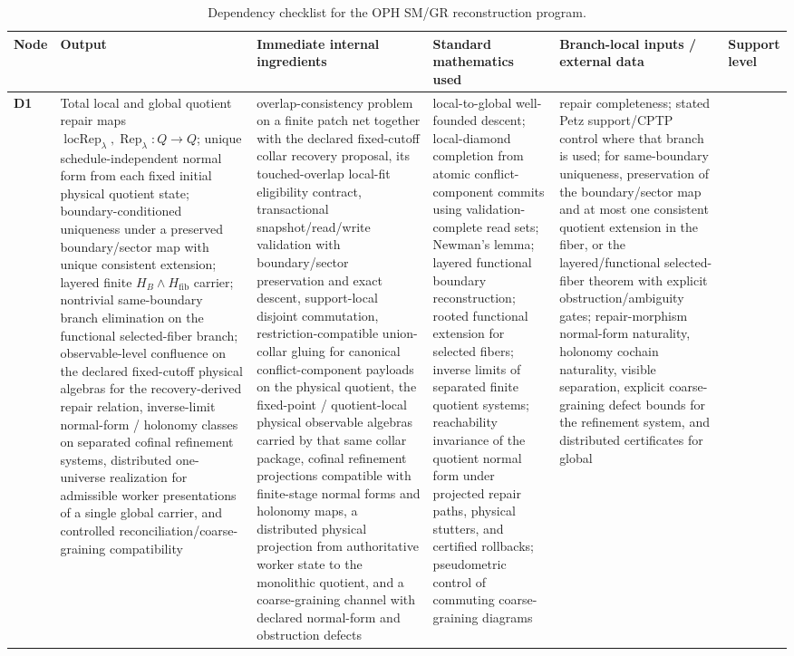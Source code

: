 \documentclass[11pt]{article}
\begin{document}
\begingroup
\tiny
\setlength{\tabcolsep}{1pt}
\begin{longtable}{@{}>{\raggedright\arraybackslash}p{}>{\raggedright\arraybackslash}p{}>{\raggedright\arraybackslash}p{}>{\raggedright\arraybackslash}p{}>{\raggedright\arraybackslash}p{}>{\raggedright\arraybackslash}p{}@{}}
\caption{Dependency checklist for the OPH SM/GR reconstruction program.}\\
\toprule
Node & Output & Immediate internal ingredients & Standard mathematics used & Branch-local inputs / external data & Support level \\
\midrule
\endhead
\bottomrule
\endfoot
\textbf{D1} & Total local and global quotient repair maps \(\operatorname{locRep}_\lambda,\operatorname{Rep}_\lambda:Q\to Q\); unique schedule-independent normal form from each fixed initial physical quotient state; boundary-conditioned uniqueness under a preserved boundary/sector map with unique consistent extension; layered finite \(H_B\wedge H_{\mathrm{fib}}\) carrier; nontrivial same-boundary branch elimination on the functional selected-fiber branch; observable-level confluence on the declared fixed-cutoff physical algebras for the recovery-derived repair relation, inverse-limit normal-form / holonomy classes on separated cofinal refinement systems, distributed one-universe realization for admissible worker presentations of a single global carrier, and controlled reconciliation/coarse-graining compatibility & overlap-consistency problem on a finite patch net together with the declared fixed-cutoff collar recovery proposal, its touched-overlap local-fit eligibility contract, transactional snapshot/read/write validation with boundary/sector preservation and exact descent, support-local disjoint commutation, restriction-compatible union-collar gluing for canonical conflict-component payloads on the physical quotient, the fixed-point / quotient-local physical observable algebras carried by that same collar package, cofinal refinement projections compatible with finite-stage normal forms and holonomy maps, a distributed physical projection from authoritative worker state to the monolithic quotient, and a coarse-graining channel with declared normal-form and obstruction defects & local-to-global well-founded descent; local-diamond completion from atomic conflict-component commits using validation-complete read sets; Newman's lemma; layered functional boundary reconstruction; rooted functional extension for selected fibers; inverse limits of separated finite quotient systems; reachability invariance of the quotient normal form under projected repair paths, physical stutters, and certified rollbacks; pseudometric control of commuting coarse-graining diagrams & repair completeness; stated Petz support/CPTP control where that branch is used; for same-boundary uniqueness, preservation of the boundary/sector map and at most one consistent quotient extension in the fiber, or the layered/functional selected-fiber theorem with explicit obstruction/ambiguity gates; repair-morphism normal-form naturality, holonomy cochain naturality, visible separation, explicit coarse-graining defect bounds for the refinement system, and distributed certificates for global 
\end{longtable}
\end{document}

